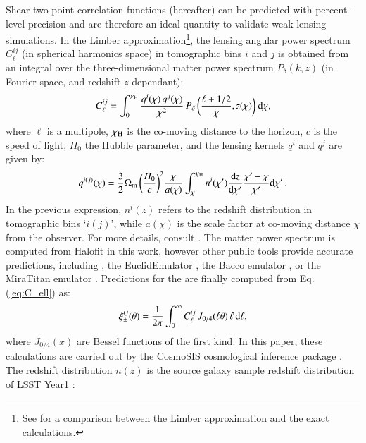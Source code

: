 Shear two-point correlation functions (\gtwopcf hereafter) can be predicted with percent-level precision and are therefore an ideal quantity to validate weak lensing simulations.
In the Limber approximation\footnote{See \citet{Kilbinger17} for a comparison between the Limber approximation and the exact calculations.}, the lensing angular power spectrum $C^{ij}_{\ell}$ (in spherical harmonics space) in tomographic bins $i$ and $j$ is obtained from an integral over the three-dimensional matter power spectrum $P_{\delta}(k, z)$ (in Fourier space, and redshift $z$ dependant):
  \begin{eqnarray}
C_{\ell}^{ij} = \int_0^{\chi_{\rm H}}  \frac{q^i(\chi) \,q^j(\chi)}{\chi^2} \, P_{\delta}\, \bigg(\frac{\ell+1/2}{\chi},z(\chi)\bigg) \ {\rm d}\chi,
\label{eq:C_ell}
\end{eqnarray}
where $\ell$ is a multipole, $\chi_{\rm H}$ is the co-moving distance to the horizon, $c$ is the speed of light, $H_0$ the Hubble parameter, and the lensing kernels $q^{i}$ and $q^j$ are given by:
\begin{eqnarray}
q^{i(j)}(\chi) = \frac{3}{2}\Omega_{\rm m} \, \bigg(\frac{H_0}{c} \bigg)^2 \frac{\chi}{a(\chi)} \int_{\chi}^{\chi_{\rm H}} n^i(\chi')\frac{{\rm d}z}{{\rm d} \chi'}\frac{\chi' - \chi}{\chi'}{\rm d}\chi' \, .
\label{eq:q_lensing}
\end{eqnarray}
In the previous expression, $n^i(z)$ refers to the redshift distribution  in tomographic bins `$i (j)$', while $a(\chi)$ is the scale factor at co-moving distance $\chi$ from the observer.
For more details, consult \citealt{Lamman_IA_guide}.
The matter power spectrum is computed from  {\sc Halofit} \citep{Takahashi2012} in this work, however other public tools provide accurate predictions, including  \citep{HMCode2020}, the {\sc EuclidEmulator} \citep{EuclidEmulator}, the {\sc Bacco} emulator \citep{BACCOEmulator}, or the {\sc MiraTitan} emulator \citep{miraTitan}. 
Predictions for the \gtwopcf are finally computed from Eq. (\ref{eq:C_ell}) as:
\begin{eqnarray}
\xi_{\pm}^{ij}(\theta) = \frac{1}{2\pi} \int_0^{\infty} C_{\ell}^{ij} \, J_{0/4}(\ell \theta) \, \ell \, {\rm d}\ell,
\label{eq:xipm_th}
\end{eqnarray}
where $J_{0/4}(x)$ are Bessel functions of the first kind. 
In this paper, these calculations are carried out by the {\sc CosmoSIS} cosmological inference package \citep{cosmoSIS}.
The redshift distribution $n (z)$ is the source galaxy sample redshift distribution of LSST Year1 \citep{LSST-SRD}:
